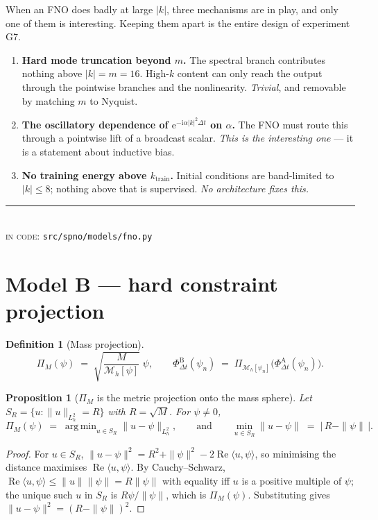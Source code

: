 \documentclass[11pt,a4paper]{article}
\theoremstyle{plain}
\newtheorem{proposition}[theorem]{Proposition}
\theoremstyle{definition}
\newtheorem{definition}[theorem]{Definition}
\theoremstyle{remark}
\newcommand{\iu}{\mathrm{i}}
\newcommand{\eu}{\mathrm{e}}
\newcommand{\dt}{\Delta t}
\newcommand{\ktrain}{k_{\mathrm{train}}}
\newcommand{\Flow}{\Phi}
\newcommand{\Mass}{\mathcal{M}}
\newcommand{\src}[1]{{\color{linknavy}\texttt{\footnotesize #1}}}
\DeclareMathOperator{\Real}{Re}
\DeclareMathOperator*{\argmin}{arg\,min}
\newcommand{\sourcenote}[1]{%
  \par\vspace{0.35em}\noindent
  {\footnotesize\color{rulegray}\rule{\linewidth}{0.4pt}\\[0.25em]
  \textsc{in code:} \src{#1}}\par\vspace{0.5em}}
\begin{document}
When an FNO does badly at large $|k|$, three mechanisms are in play, and only one of them
is interesting. Keeping them apart is the entire design of experiment G7.

\begin{enumerate}[label=(\alph*),leftmargin=1.6em,itemsep=0.25em]
\item \textbf{Hard mode truncation beyond $m$.} The spectral branch contributes nothing
above $|k|=m=16$. High-$k$ content can only reach the output through the pointwise
branches and the nonlinearity. \emph{Trivial}, and removable by matching $m$ to Nyquist.
\item \textbf{The oscillatory dependence of $\eu^{-\iu\alpha|k|^2\dt}$ on $\alpha$.} The
FNO must route this through a pointwise lift of a broadcast scalar. \emph{This is the
interesting one} --- it is a statement about inductive bias.
\item \textbf{No training energy above $\ktrain$.} Initial conditions are band-limited to
$|k|\le 8$; nothing above that is supervised. \emph{No architecture fixes this.}
\end{enumerate}

\sourcenote{src/spno/models/fno.py}

\section{Model B --- hard constraint projection}
\label{sec:projection}

\begin{definition}[Mass projection]
\label{def:proj}
\[
\Pi_{M}(\psi) \;=\; \sqrt{\frac{M}{\Mass_h[\psi]}}\;\psi,
\qquad
\Flow^{\mathrm{B}}_{\dt}(\psi_n) \;=\; \Pi_{\Mass_h[\psi_n]}\bigl(\Flow^{\mathrm{A}}_{\dt}(\psi_n)\bigr).
\]
\end{definition}

\begin{proposition}[$\Pi_M$ is the metric projection onto the mass sphere]
\label{prop:metricproj}
Let $S_R=\{u:\|u\|_{L^2_h}=R\}$ with $R=\sqrt{M}$. For $\psi\neq 0$,
\[
\Pi_M(\psi) \;=\; \argmin_{u\in S_R}\|u-\psi\|_{L^2_h},
\qquad\text{and}\qquad
\min_{u\in S_R}\|u-\psi\| \;=\; \bigl|\,R - \|\psi\|\,\bigr| .
\]
\end{proposition}

\begin{proof}
For $u\in S_R$, $\|u-\psi\|^2 = R^2 + \|\psi\|^2 - 2\Real\langle u,\psi\rangle$, so
minimising the distance maximises $\Real\langle u,\psi\rangle$. By Cauchy--Schwarz,
$\Real\langle u,\psi\rangle \le \|u\|\|\psi\| = R\|\psi\|$ with equality iff $u$ is a
positive multiple of $\psi$; the unique such $u$ in $S_R$ is $R\psi/\|\psi\|$, which is
$\Pi_M(\psi)$. Substituting gives $\|u-\psi\|^2 = (R-\|\psi\|)^2$.
\end{proof}
\end{document}
